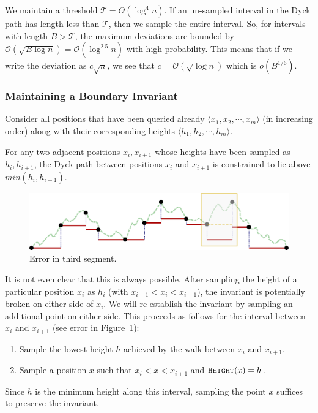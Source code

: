 We maintain a threshold $\mathcal T = \Theta(\log^4 n)$.
If an un-sampled interval in the Dyck path has length less than $\mathcal T$, then we sample the entire interval.
So, for intervals with length $B > \mathcal T$,
the maximum deviations are bounded by $\mathcal O(\sqrt{B\log n}) = \mathcal O(\log^{2.5}n)$ with high probability.
This means that if we write the deviation as $c\sqrt n$, we see that $c = \mathcal O(\sqrt{\log n})$ which is $o(B^{1/6})$.


\subsubsection{Maintaining a Boundary Invariant}%
\label{sec:maintaining_a_boundary_invariant}
Consider all positions that have been queried already $ \langle x_1, x_2,\cdots, x_m \rangle$ (in increasing order)
along with their corresponding heights $ \langle h_1, h_2,\cdots, h_m \rangle$.
\begin{proposition}
\label{prop:boundary_invariant}
For any two adjacent positions $x_i,x_{i+1}$ whose heights have been sampled as $h_i, h_{i+1}$,
the Dyck path between positions $x_i$ and $x_{i+1}$ is constrained to lie above $min(h_i, h_{i+1})$.
\end{proposition}

\begin{figure}[htpb]
    \centering
    \includegraphics[width=\textwidth]{images/dyck_boundary_invariant.pdf}
    \caption{Error in third segment.}
    \label{fig:dyck_boundary_invariant}
\end{figure}

It is not even clear that this is always possible.
After sampling the height of a particular position $x_i$ as $h_i$ (with $x_{i-1} < x_i < x_{i+1}$),
the invariant is potentially broken on either side of $x_i$.
We will re-establish the invariant by sampling an additional point on either side.
This proceeds as follows for the interval between $x_i$ and $x_{i+1}$
(see error in Figure~\ref{fig:dyck_boundary_invariant}):
\begin{enumerate}
    \item Sample the lowest height $h$ achieved by the walk between $x_i$ and $x_{i+1}$.
    \item Sample a position $x$ such that $x_i < x < x_{i+1}$ and $\texttt{\textsc{Height}}(x) = h$.
\end{enumerate}
Since $h$ is the minimum height along this interval, sampling the point $x$ suffices to preserve the invariant.


